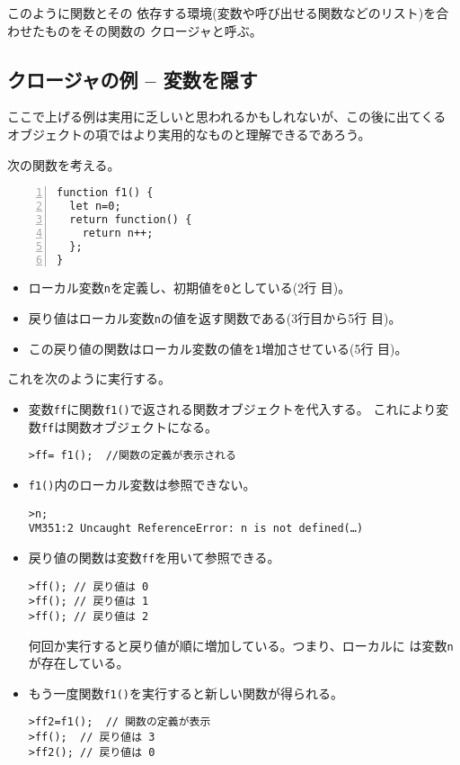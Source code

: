 このように関数とその
依存する環境(変数や呼び出せる関数などのリスト)を合わせたものをその関数の
クロージャと呼ぶ。

\subsection{クロージャの例 -- 変数を隠す}
ここで上げる例は実用に乏しいと思われるかもしれないが、この後に出てくる
オブジェクトの項ではより実用的なものと理解できるであろう。
\begin{Exec}\label{Closure1}\upshape
 次の関数を考える。
\begin{Verbatim}[numbers=left]
function f1() {
  let n=0;
  return function() {
    return n++;
  };
}
\end{Verbatim}
 \begin{itemize}\upshape
	\item ローカル変数\texttt{n}を定義し、初期値を\texttt{0}としている(2行
				目)。
	\item 戻り値はローカル変数\texttt{n}の値を返す関数である(3行目から5行
				目)。
	\item この戻り値の関数はローカル変数の値を\texttt{1}増加させている(5行
				目)。
 \end{itemize}
 これを次のように実行する。
 \begin{itemize}\upshape
	\item  変数\texttt{ff}に関数\texttt{f1()}で返される関数オブジェクトを代入する。
	これにより変数\Verb+ff+は関数オブジェクトになる。
\begin{Verbatim}
>ff= f1();  //関数の定義が表示される
\end{Verbatim}
	\item \texttt{f1()}内のローカル変数は参照できない。
\begin{Verbatim}
>n;
VM351:2 Uncaught ReferenceError: n is not defined(…)
\end{Verbatim}
	\item 戻り値の関数は変数\texttt{ff}を用いて参照できる。
\begin{Verbatim}
>ff(); // 戻り値は 0
>ff(); // 戻り値は 1
>ff(); // 戻り値は 2
\end{Verbatim}
何回か実行すると戻り値が順に増加している。つまり、ローカルに
は変数\texttt{n}が存在している。
	\item もう一度関数\texttt{f1()}を実行すると新しい関数が得られる。
\begin{Verbatim}
>ff2=f1();  // 関数の定義が表示
>ff();  // 戻り値は 3
>ff2(); // 戻り値は 0
\end{Verbatim}
 \end{itemize}
\end{Exec}
